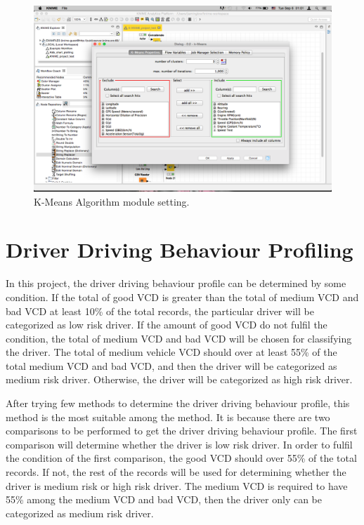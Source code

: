 \begin{figure}[hbt!]\centering
\includegraphics[width=.75\textwidth]{image/KNIMEkmean}
\caption{K-Means Algorithm module setting.}
\label{fig:kmean}
\end{figure}



\section{Driver Driving Behaviour Profiling}
In this project, the driver driving behaviour profile can be determined by some condition. %
If the total of good VCD is greater than the total of medium VCD and bad VCD at least 10\% of the total records, the particular driver will be categorized as low risk driver. If the amount of good VCD do not fulfil the condition, the total of medium VCD and bad VCD will be chosen for classifying the driver. The total of medium vehicle VCD should over at least 55\% of the total medium VCD and bad VCD, and then the driver will be categorized as medium risk driver. Otherwise, the driver will be categorized as high risk driver.

After trying few methods to determine the driver driving behaviour profile, this method is the most suitable among the method. It is because there are two comparisons to be performed to get the driver driving behaviour profile. The first comparison will determine whether the driver is low risk driver. In order to fulfil the condition of the first comparison, the good VCD should over 55\% of the total records. If not, the rest of the records will be used for determining whether the driver is medium risk or high risk driver. The medium VCD is required to have 55\% among the medium VCD and bad VCD, then the driver only can be categorized as medium risk driver.

